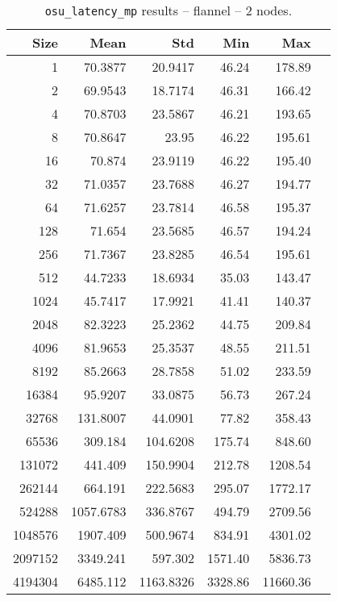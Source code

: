 \begin{table}[htbp]
\begin{minipage}{.48\textwidth}
  \label{tab:latency-mp-flannel-1nodes}
  \end{minipage}
\hfill
\begin{minipage}{.48\textwidth}
    \centering
    \footnotesize
  \begin{tabular}{rrrrrr}
	\toprule
	\textbf{Size} & \textbf{Mean} & \textbf{Std} & \textbf{Min} & \textbf{Max}	\\
	\midrule
	1	&	70.3877   	&	20.9417	&	46.24	&	178.89	\\
	2	&	69.9543   	&	18.7174	&	46.31	&	166.42	\\
	4	&	70.8703   	&	23.5867	&	46.21	&	193.65	\\
	8	&	70.8647   	&	23.95	&	46.22	&	195.61	\\
	16	&	70.874   	&	23.9119	&	46.22	&	195.40	\\
	32	&	71.0357   	&	23.7688	&	46.27	&	194.77	\\
	64	&	71.6257   	&	23.7814	&	46.58	&	195.37	\\
	128	&	71.654   	&	23.5685	&	46.57	&	194.24	\\
	256	&	71.7367   	&	23.8285	&	46.54	&	195.61	\\
	512	&	44.7233   	&	18.6934	&	35.03	&	143.47	\\
	1024	&	45.7417   	&	17.9921	&	41.41	&	140.37	\\
	2048	&	82.3223   	&	25.2362	&	44.75	&	209.84	\\
	4096	&	81.9653   	&	25.3537	&	48.55	&	211.51	\\
	8192	&	85.2663   	&	28.7858	&	51.02	&	233.59	\\
	16384	&	95.9207   	&	33.0875	&	56.73	&	267.24	\\
	32768	&	131.8007   	&	44.0901	&	77.82	&	358.43	\\
	65536	&	309.184   	&	104.6208	&	175.74	&	848.60	\\
	131072	&	441.409   	&	150.9904	&	212.78	&	1208.54	\\
	262144	&	664.191   	&	222.5683	&	295.07	&	1772.17	\\
	524288	&	1057.6783   	&	336.8767	&	494.79	&	2709.56	\\
	1048576	&	1907.409   	&	500.9674	&	834.91	&	4301.02	\\
	2097152	&	3349.241   	&	597.302	&	1571.40	&	5836.73	\\
	4194304	&	6485.112   	&	1163.8326	&	3328.86	&	11660.36	\\
	\bottomrule
	\end{tabular}
  \caption{\texttt{osu\_latency\_mp} results -- flannel -- 2 nodes.}
  \label{tab:latency-mp-flannel-2nodes}
  \end{minipage}
\end{table}


